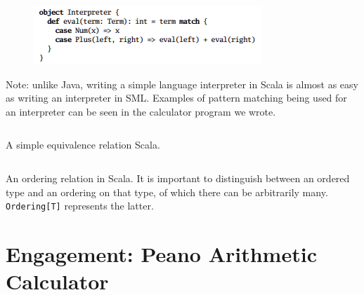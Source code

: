 \documentclass[jou,apacite]{IEEEtran}
\begin{document}
\begin{figure}[h]
  \centering
  \includegraphics[width=\columnwidth]{pattern_match}
  \caption{}
  \label{fig:example}
\end{figure}

Note: unlike Java, writing a simple language interpreter in Scala is almost as easy as writing an interpreter in SML. Examples of pattern matching being used for an interpreter can be seen in the calculator program we wrote.




\begin{listing}
  \inputminted[firstline=3, frame=single]{Scala}{../examples/Equiv.scala}
  \caption{A simple equivalence relation Scala.}
  \label{lst:equiv}
\end{listing}

\begin{listing}
  \inputminted[firstline=3, frame=single]{Scala}{../examples/Ord.scala}
  \caption{An ordering relation in Scala. It is important to distinguish between
    an ordered type and an ordering on that type, of which there can be
    arbitrarily many. \texttt{Ordering[T]} represents the latter.}
  \label{lst:ordering}
\end{listing}




\section{Engagement: Peano Arithmetic Calculator}
\label{sec:engag-peano-arithm}
\end{document}
